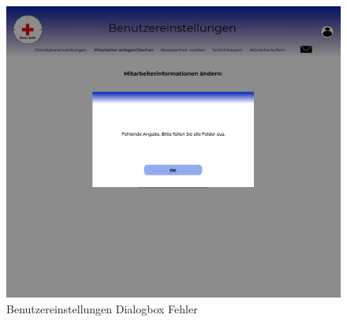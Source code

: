 \documentclass[11pt,
paper=a4,
bibtotocnumbered,	  %
liststotocnumbered,  %
DIV=calc,		  %
tablecaptionabove,	  %
headinclude,
]{article}
\begin{document}
\begin{figure}[H]
\includegraphics[width=1\textwidth]{Bilder/Screens/Benutzereinstellungen(2).jpg}{\centering}
\caption{Benutzereinstellungen Dialogbox Fehler}
\end{figure}
\end{document}
